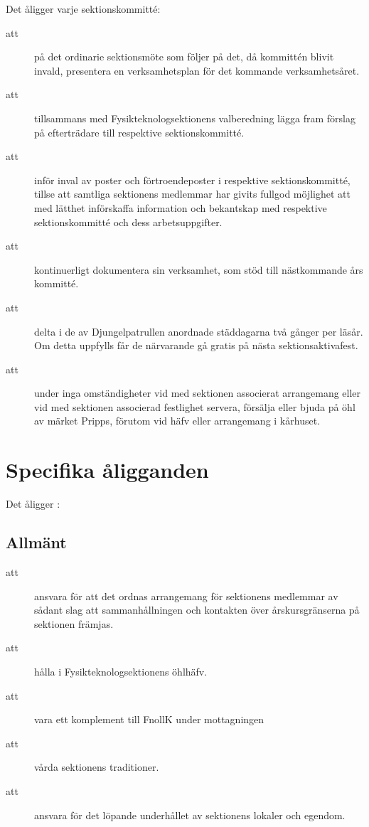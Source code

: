 Det åligger varje sektionskommitté:
\begin{description}
    \item[att] på det ordinarie sektionsmöte som följer på det, då kommittén blivit invald, presentera en verksamhetsplan för det kommande verksamhetsåret.
      \item[att] tillsammans med Fysikteknologsektionens valberedning lägga fram förslag på efterträdare till respektive sektionskommitté.
      \item[att] inför inval av poster och förtroendeposter i respektive sektionskommitté, tillse att samtliga sektionens medlemmar har givits fullgod möjlighet att med lätthet införskaffa information och bekantskap med respektive sektionskommitté och dess arbetsuppgifter.
      \item[att] kontinuerligt dokumentera sin verksamhet, som stöd till näst\-komm\-ande års kommitté.
      \item[att] delta i de av Djungelpatrullen anordnade städdagarna två gånger per
      läsår. Om detta uppfylls får de närvarande gå gratis på nästa
      sektionsaktivafest.
      \item[att] under inga omständigheter vid med sektionen associerat arrangemang eller vid med sektionen associerad festlighet servera, försälja eller bjuda på öhl av märket Pripps, förutom vid häfv eller arrangemang i kårhuset.
      
    \end{description}



\section{Specifika åligganden}
Det åligger \forening:
\subsection {Allmänt}
\begin{description}
\item[att] ansvara för att det ordnas arrangemang för sektionens medlemmar av sådant slag att sammanhållningen och kontakten över årskursgränserna på sektionen främjas.

\item[att] hålla i Fysikteknologsektionens öhlhäfv.

\item[att] vara ett komplement till FnollK under mottagningen

\item[att] vårda sektionens traditioner.

\item[att] ansvara för det löpande underhållet av sektionens lokaler och egendom. 

\end{description}


